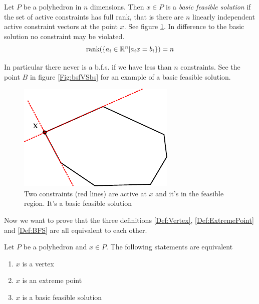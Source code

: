 \begin{Def}\label{Def:BFS} Let $P$ be a polyhedron in $n$ dimensions. Then $x\in P$ is a \emph{basic feasible solution} if the set of active constraints has full rank, that is there are $n$ linearly independent active constraint vectors at the point $x$. See figure \ref{Fig:bfsActiveConstraints}. In difference to the basic solution no constraint may be violated.
\[\mbox{rank}(\{a_i\in \mathbb{R}^n|a_ix=b_i\}) = n\]

In particular there never is a b.f.s. if we have less than $n$ constraints. See the point $B$ in figure \ref{Fig:bsfVSbs} for an example of a basic feasible solution.
\end{Def}

\begin{figure}[hbt]
\begin{center}
\includegraphics{./images/bfs.pdf}
\end{center}
\caption{Two constraints (red lines) are active at $x$ and it's in the feasible region. It's a basic feasible solution}
\label{Fig:bfsActiveConstraints}
\end{figure}

Now we want to prove that the three definitions \ref{Def:Vertex}, \ref{Def:ExtremePoint} and \ref{Def:BFS} are all equivalent to each other.

\begin{thm} \label{Thm:cornerEquiv} Let $P$ be a polyhedron and $x\in P$. The following statements are equivalent
\begin{enumerate}
\item $x$ is a vertex\label{enu:corner1}
\item $x$ is an extreme point\label{enu:corner2}
\item $x$ is a basic feasible solution\label{enu:corner3}
\end{enumerate}
\end{thm}

